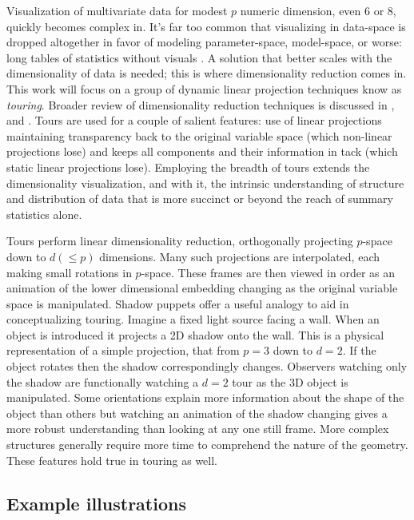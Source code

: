 \documentclass{monashthesis}
\begin{document}
Visualization of multivariate data for modest \(p\) numeric dimension,
even 6 or 8, quickly becomes complex in. It's far too common that
visualizing in data-space is dropped altogether in favor of modeling
parameter-space, model-space, or worse: long tables of statistics
without visuals \autocite{wickham_visualizing_2015}. A solution that
better scales with the dimensionality of data is needed; this is where
dimensionality reduction comes in. This work will focus on a group of
dynamic linear projection techniques know as \emph{touring}. Broader
review of dimensionality reduction techniques is discussed in
\textcite{grinstein_high-dimensional_2002}, and
\textcite{heer_tour_2010}. Tours are used for a couple of salient
features: use of linear projections maintaining transparency back to the
original variable space (which non-linear projections lose) and keeps
all components and their information in tack (which static linear
projections lose). Employing the breadth of tours extends the
dimensionality visualization, and with it, the intrinsic understanding
of structure and distribution of data that is more succinct or beyond
the reach of summary statistics alone.

Tours perform linear dimensionality reduction, orthogonally projecting
\(p\)-space down to \(d(\leq p)\) dimensions. Many such projections are
interpolated, each making small rotations in \(p\)-space. These frames
are then viewed in order as an animation of the lower dimensional
embedding changing as the original variable space is manipulated. Shadow
puppets offer a useful analogy to aid in conceptualizing touring.
Imagine a fixed light source facing a wall. When an object is introduced
it projects a 2D shadow onto the wall. This is a physical representation
of a simple projection, that from \(p=3\) down to \(d=2\). If the object
rotates then the shadow correspondingly changes. Observers watching only
the shadow are functionally watching a \(d=2\) tour as the 3D object is
manipulated. Some orientations explain more information about the shape
of the object than others but watching an animation of the shadow
changing gives a more robust understanding than looking at any one still
frame. More complex structures generally require more time to comprehend
the nature of the geometry. These features hold true in touring as well.

\subsection{Example illustrations}\label{example-illustrations}
\end{document}
